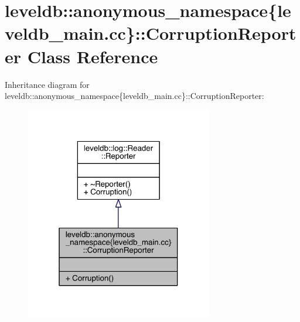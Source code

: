 \hypertarget{classleveldb_1_1anonymous__namespace_02leveldb__main_8cc_03_1_1_corruption_reporter}{}\section{leveldb\+:\+:anonymous\+\_\+namespace\{leveldb\+\_\+main.\+cc\}\+:\+:Corruption\+Reporter Class Reference}
\label{classleveldb_1_1anonymous__namespace_02leveldb__main_8cc_03_1_1_corruption_reporter}


Inheritance diagram for leveldb\+:\+:anonymous\+\_\+namespace\{leveldb\+\_\+main.\+cc\}\+:\+:Corruption\+Reporter\+:
\nopagebreak
\begin{figure}[H]
\begin{center}
\leavevmode
\includegraphics[width=232pt]{classleveldb_1_1anonymous__namespace_02leveldb__main_8cc_03_1_1_corruption_reporter__inherit__graph}
\end{center}
\end{figure}


